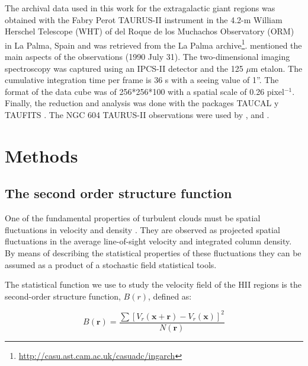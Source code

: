 \documentclass[fleqn,usenatbib, useAMS, a4paper]{mnras}
\begin{document}
The archival data used in this work for the extragalactic giant regions was obtained with the Fabry Perot TAURUS-II instrument in the 4.2-m William Herschel Telescope (WHT) of del Roque de los Muchachos Observatory (ORM) in La Palma, Spain and was retrieved from the La Palma archive\footnote{\url{http://casu.ast.cam.ac.uk/casuadc/ingarch}}.
\citet{sabalisck1995supersonic} mentioned the main aspects of the observations (1990 July 31).
The two-dimensional imaging spectroscopy was captured using an IPCS-II detector and the 125 $\mu$m etalon.
The cumulative integration time per frame is 36 s with a seeing value of 1''.
The format of the data cube was of 256*256*100 with a spatial scale of 0.26 pixel$^{-1}$.
Finally, the reduction and analysis was done with the packages TAUCAL y TAUFITS \citep{1992ASPC...25..445L}.
The NGC 604 TAURUS-II observations were used by \citet{sabalisck1995supersonic}, \citet{tanco1997} and \citet{2019arXiv191203543M}.






\section{Methods}\label{sec:met}

\subsection{The second order structure function}

One of the fundamental properties of turbulent clouds must be spatial fluctuations in velocity and density \citep{1984ApJ...277..556S}.
They are observed as projected spatial fluctuations in the average line-of-sight velocity and integrated column density.
By means of describing the statistical properties of these fluctuations they can be assumed as a product of a stochastic field statistical tools.

The statistical function we use to study the velocity field of the HII regions is the second-order structure function, $B(r)$, defined as:

\begin{equation}\label{eq:S}
B(\boldsymbol{r})=\dfrac{\sum[V_{r}(\boldsymbol{x}+\boldsymbol{r})-V_{r}(\boldsymbol{x}) ]^{2}}{N(\boldsymbol{r})}
\end{equation}
\end{document}
